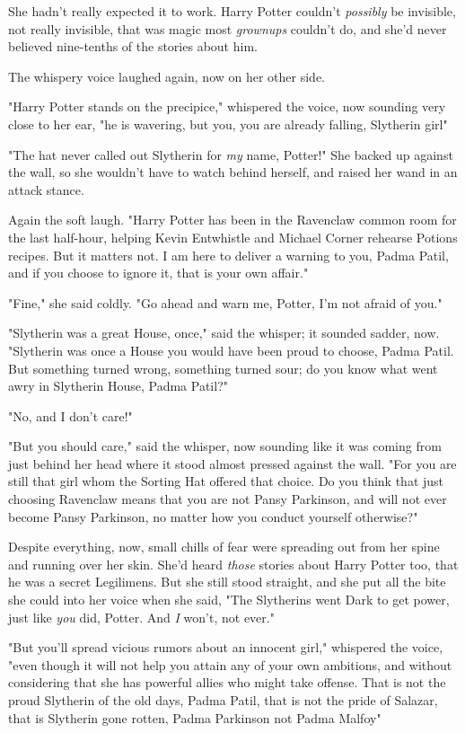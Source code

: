 She hadn't really expected it to work. Harry Potter couldn't \emph{possibly} be
invisible, not really invisible, that was magic most \emph{grownups} couldn't
do, and she'd never believed nine-tenths of the stories about him.

The whispery voice laughed again, now on her other side.

"Harry Potter stands on the precipice," whispered the voice, now sounding very
close to her ear, "he is wavering, but you, you are already falling, Slytherin
girl{\el}"

"The hat never called out Slytherin for \emph{my} name, Potter!" She backed up
against the wall, so she wouldn't have to watch behind herself, and raised her
wand in an attack stance.

Again the soft laugh. "Harry Potter has been in the Ravenclaw common room for
the last half-hour, helping Kevin Entwhistle and Michael Corner rehearse
Potions recipes. But it matters not. I am here to deliver a warning to you,
Padma Patil, and if you choose to ignore it, that is your own affair."

"Fine," she said coldly. "Go ahead and warn me, Potter, I'm not afraid of you."

"Slytherin was a great House, once," said the whisper; it sounded sadder, now.
"Slytherin was once a House you would have been proud to choose, Padma Patil.
But something turned wrong, something turned sour; do you know what went awry
in Slytherin House, Padma Patil?"

"No, and I don't care!"

"But you should care," said the whisper, now sounding like it was coming from
just behind her head where it stood almost pressed against the wall. "For you
are still that girl whom the Sorting Hat offered that choice. Do you think that
just choosing Ravenclaw means that you are not Pansy Parkinson, and will not
ever become Pansy Parkinson, no matter how you conduct yourself otherwise?"

Despite everything, now, small chills of fear were spreading out from her spine
and running over her skin. She'd heard \emph{those} stories about Harry Potter
too, that he was a secret Legilimens. But she still stood straight, and she put
all the bite she could into her voice when she said, "The Slytherins went Dark
to get power, just like \emph{you} did, Potter. And \emph{I} won't, not ever."

"But you'll spread vicious rumors about an innocent girl," whispered the voice,
"even though it will not help you attain any of your own ambitions, and without
considering that she has powerful allies who might take offense. That is not
the proud Slytherin of the old days, Padma Patil, that is not the pride of
Salazar, that is Slytherin gone rotten, Padma Parkinson not Padma
Malfoy{\el}"

